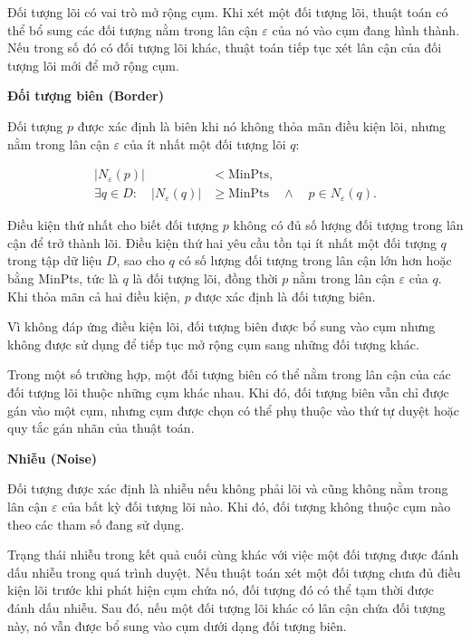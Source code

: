 Đối tượng lõi có vai trò mở rộng cụm. Khi xét một đối tượng lõi, thuật toán có thể bổ sung các đối tượng nằm trong lân cận \(\varepsilon\) của nó vào cụm đang hình thành. Nếu trong số đó có đối tượng lõi khác, thuật toán tiếp tục xét lân cận của đối tượng lõi mới để mở rộng cụm.

\textbf{Đối tượng biên (Border)}

Đối tượng \(p\) được xác định là biên khi nó không thỏa mãn điều kiện lõi, nhưng nằm trong lân cận \(\varepsilon\) của ít nhất một đối tượng lõi \(q\):

\begin{equation}
\begin{aligned}
    |N_{\varepsilon}(p)| &< \mathrm{MinPts},\\
    \exists q \in D:\quad
    |N_{\varepsilon}(q)| &\geq \mathrm{MinPts}
    \quad \land \quad
    p \in N_{\varepsilon}(q).
\end{aligned}
\end{equation}

Điều kiện thứ nhất cho biết đối tượng \(p\) không có đủ số lượng đối tượng trong lân cận để trở thành lõi. Điều kiện thứ hai yêu cầu tồn tại ít nhất một đối tượng \(q\) trong tập dữ liệu \(D\), sao cho \(q\) có số lượng đối tượng trong lân cận lớn hơn hoặc bằng MinPts, tức là \(q\) là đối tượng lõi, đồng thời \(p\) nằm trong lân cận \(\varepsilon\) của \(q\). Khi thỏa mãn cả hai điều kiện, \(p\) được xác định là đối tượng biên.

Vì không đáp ứng điều kiện lõi, đối tượng biên được bổ sung vào cụm nhưng không được sử dụng để tiếp tục mở rộng cụm sang những đối tượng khác.

Trong một số trường hợp, một đối tượng biên có thể nằm trong lân cận của các đối tượng lõi thuộc những cụm khác nhau. Khi đó, đối tượng biên vẫn chỉ được gán vào một cụm, nhưng cụm được chọn có thể phụ thuộc vào thứ tự duyệt hoặc quy tắc gán nhãn của thuật toán.

\textbf{Nhiễu (Noise)}

Đối tượng được xác định là nhiễu nếu không phải lõi và cũng không nằm trong lân cận \(\varepsilon\) của bất kỳ đối tượng lõi nào. Khi đó, đối tượng không thuộc cụm nào theo các tham số đang sử dụng.

Trạng thái nhiễu trong kết quả cuối cùng khác với việc một đối tượng được đánh dấu nhiễu trong quá trình duyệt. Nếu thuật toán xét một đối tượng chưa đủ điều kiện lõi trước khi phát hiện cụm chứa nó, đối tượng đó có thể tạm thời được đánh dấu nhiễu. Sau đó, nếu một đối tượng lõi khác có lân cận chứa đối tượng này, nó vẫn được bổ sung vào cụm dưới dạng đối tượng biên.

